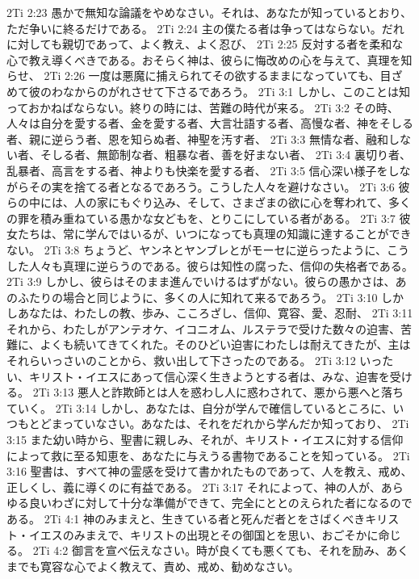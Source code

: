 2Ti 2:23  愚かで無知な論議をやめなさい。それは、あなたが知っているとおり、ただ争いに終るだけである。
2Ti 2:24  主の僕たる者は争ってはならない。だれに対しても親切であって、よく教え、よく忍び、
2Ti 2:25  反対する者を柔和な心で教え導くべきである。おそらく神は、彼らに悔改めの心を与えて、真理を知らせ、
2Ti 2:26  一度は悪魔に捕えられてその欲するままになっていても、目ざめて彼のわなからのがれさせて下さるであろう。
2Ti 3:1  しかし、このことは知っておかねばならない。終りの時には、苦難の時代が来る。
2Ti 3:2  その時、人々は自分を愛する者、金を愛する者、大言壮語する者、高慢な者、神をそしる者、親に逆らう者、恩を知らぬ者、神聖を汚す者、
2Ti 3:3  無情な者、融和しない者、そしる者、無節制な者、粗暴な者、善を好まない者、
2Ti 3:4  裏切り者、乱暴者、高言をする者、神よりも快楽を愛する者、
2Ti 3:5  信心深い様子をしながらその実を捨てる者となるであろう。こうした人々を避けなさい。
2Ti 3:6  彼らの中には、人の家にもぐり込み、そして、さまざまの欲に心を奪われて、多くの罪を積み重ねている愚かな女どもを、とりこにしている者がある。
2Ti 3:7  彼女たちは、常に学んではいるが、いつになっても真理の知識に達することができない。
2Ti 3:8  ちょうど、ヤンネとヤンブレとがモーセに逆らったように、こうした人々も真理に逆らうのである。彼らは知性の腐った、信仰の失格者である。
2Ti 3:9  しかし、彼らはそのまま進んでいけるはずがない。彼らの愚かさは、あのふたりの場合と同じように、多くの人に知れて来るであろう。
2Ti 3:10  しかしあなたは、わたしの教、歩み、こころざし、信仰、寛容、愛、忍耐、
2Ti 3:11  それから、わたしがアンテオケ、イコニオム、ルステラで受けた数々の迫害、苦難に、よくも続いてきてくれた。そのひどい迫害にわたしは耐えてきたが、主はそれらいっさいのことから、救い出して下さったのである。
2Ti 3:12  いったい、キリスト・イエスにあって信心深く生きようとする者は、みな、迫害を受ける。
2Ti 3:13  悪人と詐欺師とは人を惑わし人に惑わされて、悪から悪へと落ちていく。
2Ti 3:14  しかし、あなたは、自分が学んで確信しているところに、いつもとどまっていなさい。あなたは、それをだれから学んだか知っており、
2Ti 3:15  また幼い時から、聖書に親しみ、それが、キリスト・イエスに対する信仰によって救に至る知恵を、あなたに与えうる書物であることを知っている。
2Ti 3:16  聖書は、すべて神の霊感を受けて書かれたものであって、人を教え、戒め、正しくし、義に導くのに有益である。
2Ti 3:17  それによって、神の人が、あらゆる良いわざに対して十分な準備ができて、完全にととのえられた者になるのである。
2Ti 4:1  神のみまえと、生きている者と死んだ者とをさばくべきキリスト・イエスのみまえで、キリストの出現とその御国とを思い、おごそかに命じる。
2Ti 4:2  御言を宣べ伝えなさい。時が良くても悪くても、それを励み、あくまでも寛容な心でよく教えて、責め、戒め、勧めなさい。
